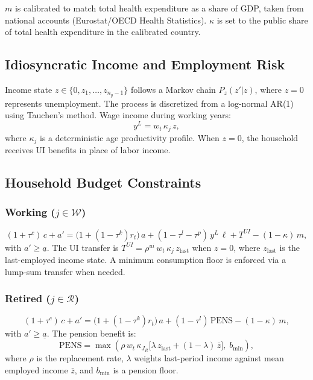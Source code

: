 $m$ is calibrated to match total health expenditure as a share of GDP, taken from national accounts (Eurostat/OECD Health Statistics). $\kappa$ is set to the public share of total health expenditure in the calibrated country.

\subsection{Idiosyncratic Income and Employment Risk}
Income state $z \in \{0, z_1, \dots, z_{n_y-1}\}$ follows a Markov chain $P_z(z'|z)$, where $z=0$ represents unemployment. The process is discretized from a log-normal AR(1) using Tauchen's method. Wage income during working years:
\begin{equation}
y^L = w_t\,\kappa_j\,z,
\end{equation}
where $\kappa_j$ is a deterministic age productivity profile. When $z=0$, the household receives UI benefits in place of labor income.

\subsection{Household Budget Constraints}\label{sec:household-bc}

\subsubsection*{Working ($j \in \mathcal{W}$)}
\begin{equation}\label{eq:bc-work}
(1+\tau^c)\,c + a' = \bigl(1+(1-\tau^k)r_t\bigr)\,a + (1-\tau^l-\tau^p)\,y^L\,\ell + T^{UI} - (1-\kappa)\,m,
\end{equation}
with $a' \geq \underline{a}$. The UI transfer is $T^{UI} = \rho^{ui}\,w_t\,\kappa_j\,z_{\text{last}}$ when $z=0$, where $z_{\text{last}}$ is the last-employed income state. A minimum consumption floor is enforced via a lump-sum transfer when needed.

\subsubsection*{Retired ($j \in \mathcal{R}$)}
\begin{equation}\label{eq:bc-ret}
(1+\tau^c)\,c + a' = \bigl(1+(1-\tau^k)r_t\bigr)\,a + (1-\tau^l)\,\text{PENS} - (1-\kappa)\,m,
\end{equation}
with $a' \geq \underline{a}$. The pension benefit is:
\begin{equation}\label{eq:pension}
\text{PENS} = \max\!\left(\rho\,w_t\,\kappa_{J_R}\bigl[\lambda\, z_{\text{last}} + (1-\lambda)\,\bar{z}\bigr],\; b_{\min}\right),
\end{equation}
where $\rho$ is the replacement rate, $\lambda$ weights last-period income against mean employed income $\bar{z}$, and $b_{\min}$ is a pension floor.

